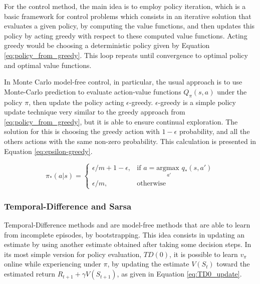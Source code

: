 For the control method, the main idea is to employ policy iteration, which is a basic framework for control problems which consists in an iterative solution that evaluates a given policy, by computing the value functions, and then updates this policy by acting greedy with respect to these computed value functions. Acting greedy would be choosing a deterministic policy given by Equation \eqref{eq:policy_from_greedy}. This loop repeats until convergence to optimal policy and optimal value functions.

In Monte Carlo model-free control, in particular, the usual approach is to use Monte-Carlo prediction to evaluate action-value functions $Q_{\pi}(s,a)$ under the policy $\pi$, then update the policy acting $\epsilon$-greedy. $\epsilon$-greedy is a simple policy update technique very similar to the greedy approach from \eqref{eq:policy_from_greedy}, but it is able to ensure continual exploration. The solution for this is choosing the greedy action with $1-\epsilon$ probability, and all the others actions with the same non-zero probability. This calculation is presented in Equation \eqref{eq:epsilon-greedy}.

\begin{equation}
 \pi_*(a | s) = 
 \begin{cases}
    \epsilon/m + 1 - \epsilon ,& \text{if } a = \underset{a'}{\textrm{argmax }} q_*(s,a')\\
    \epsilon/m ,& \text{otherwise}
 \end{cases}
 \label{eq:epsilon-greedy}
\end{equation}



\subsubsection{Temporal-Difference and Sarsa}

Temporal-Difference methods \cite{Sutton1998} and \cite{TDLearning} are model-free methods that are able to learn from incomplete episodes, by bootstrapping. This idea consists in updating an estimate by using another estimate obtained after taking some decision steps. In its most simple version for policy evaluation, $TD(0)$, it is possible to learn $v_{\pi}$ online while experiencing under $\pi$, by updating the estimate $V(S_t)$ toward the estimated return $R_{t+1} + \gamma V(S_{t+1})$, as given in Equation \eqref{eq:TD0_update}.

